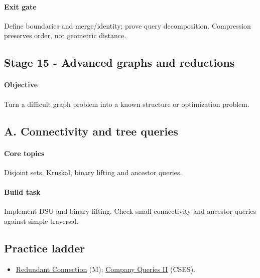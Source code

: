 \documentclass[11pt,letterpaper]{article}
\begin{document}
\paragraph*{Exit gate}

Define boundaries and merge/identity; prove query decomposition. Compression preserves order, not geometric distance.

\par{}
\begin{samepage}
\section{Stage 15 - Advanced graphs and reductions}\label{sec:19}

\label{stage:15}


\paragraph*{Objective}

Turn a difficult graph problem into a known structure or optimization problem.

\end{samepage}

\subsection*{A. Connectivity and tree queries}

\paragraph*{Core topics}

Disjoint sets, Kruskal, binary lifting and ancestor queries.

\paragraph*{Build task}

Implement DSU and binary lifting. Check small connectivity and ancestor queries against simple traversal.

\subsection*{Practice ladder}

\begin{itemize}

\item \href{https://leetcode.com/problems/redundant-connection/}{Redundant Connection} (M); \href{https://cses.fi/problemset/task/1688}{Company Queries II} (CSES).

\end{itemize}
\end{document}
